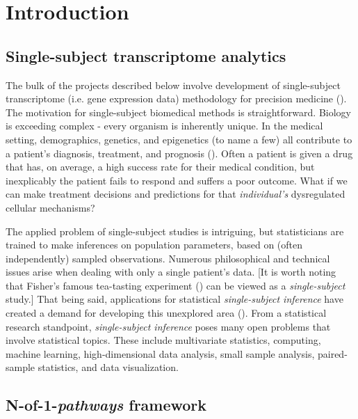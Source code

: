 \chapter{Introduction}\label{Chap:Intro}

\section{Single-subject transcriptome analytics}\label{sec:nof1}

\indent \indent The bulk of the projects described below involve development of single-subject transcriptome (i.e. gene expression data) methodology for precision medicine (\cite{Hamburg2010}). The motivation for single-subject biomedical methods is straightforward. Biology is exceeding complex - every organism is inherently unique. In the medical setting, demographics, genetics, and epigenetics (to name a few) all contribute to a patient's diagnosis, treatment, and prognosis (\cite{Kern2012}). Often a patient is given a drug that has, on average, a high success rate for their medical condition, but inexplicably the patient fails to respond and suffers a poor outcome. What if we can make treatment decisions and predictions for that \emph{individual's} dysregulated cellular mechanisms? 

The applied problem of single-subject studies is intriguing, but statisticians are trained to make inferences on population parameters, based on (often independently) sampled observations. Numerous philosophical and technical issues arise when dealing with only a single patient's data. [It is worth noting that Fisher's famous tea-tasting experiment (\cite{Fisher1935}) can be viewed as a \emph{single-subject} study.] That being said, applications for statistical \emph{single-subject inference} have created a demand for developing this unexplored area (\cite{Bacchetti2011}). From a statistical research standpoint, \emph{single-subject inference} poses many open problems that involve statistical topics. These include multivariate statistics, computing, machine learning, high-dimensional data analysis, small sample analysis, paired-sample statistics, and data visualization.

\section{N-of-1-\emph{pathways} framework}\label{sec:nof1pathways}

